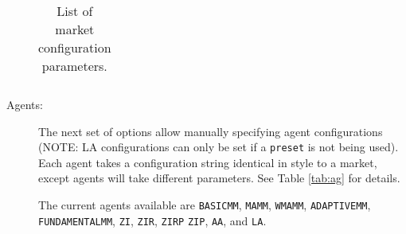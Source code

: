 \documentclass[11pt]{article}
\begin{document}
\begin{description}
\begin{table}
\begin{tabular}[f]{p{} c p{}}
\end{tabular}
\caption{List of market configuration parameters.}
\label{tab:mkt}
\end{table}

\item[Agents:] The next set of options allow manually specifying agent
  configurations (NOTE: LA configurations can only be set if a \texttt{preset} is not being used). 
   Each agent takes a configuration string identical in style to a market, except agents
  will take different parameters. See Table \ref{tab:ag} for details.
  
  The current agents available are \texttt{BASICMM}, \texttt{MAMM}, \texttt{WMAMM}, \texttt{ADAPTIVEMM}, \texttt{FUNDAMENTALMM},
  \texttt{ZI}, \texttt{ZIR}, \texttt{ZIRP} \texttt{ZIP}, \texttt{AA}, and \texttt{LA}.
  

\end{description}
\end{document}
